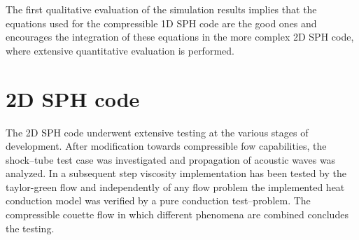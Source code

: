 \documentclass{report}
\begin{document}
The first qualitative evaluation of the simulation results implies that the equations used for the compressible 1D SPH code are the good ones and encourages the integration of these equations in the more complex 2D SPH code, where extensive quantitative evaluation is performed.  

 








\section{2D SPH code}
\label{sec:2DSPHcodeResults}

The 2D SPH code underwent extensive testing at the various stages of development. After modification towards compressible fow capabilities, the shock--tube test case was investigated and propagation of acoustic waves was analyzed. In a subsequent step viscosity implementation has been tested by the taylor-green flow and independently of any flow problem the implemented heat conduction model was verified by a pure conduction test--problem. The compressible couette flow in which different phenomena are combined concludes the testing.
\end{document}
